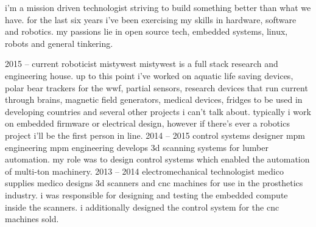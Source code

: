 \documentclass[9pt]{developercv} %
\begin{document}
\begin{minipage}[t]{0.4\textwidth} %
	\vspace{-\baselineskip} %
  i'm a mission driven technologist striving to build something better than what we have. for the last six years i've been exercising my skills in hardware, software and robotics. my passions lie in open source tech, embedded systems, linux, robots and general tinkering. 
\end{minipage}
\hfill %
\begin{minipage}[t]{0.5\textwidth} %
	\vspace{-\baselineskip} %
	\begin{barchart}{5.5}
	\end{barchart}
\end{minipage}


\begin{entrylist}
	\entry
		{2015 -- current}
		{roboticist}
		{mistywest}
		{mistywest is a full stack research and engineering house. up to this point i've worked on aquatic life saving devices, polar bear trackers for the wwf, partial sensors, research devices that run current through brains, magnetic field generators, medical devices, fridges to be used in developing countries and several other projects i can't talk about. typically i work on embedded firmware or electrical design, however if there's ever a robotics project i'll be the first person in line.}
	\entry
		{2014 -- 2015}
		{control systems designer}
		{mpm engineering}
		{mpm engineering develops 3d scanning systems for lumber automation. my role was to design control systems which enabled the automation of multi-ton machinery.}
	\entry
		{2013 -- 2014}
		{electromechanical technologist}
		{medico supplies}
		{medico designs 3d scanners and cnc machines for use in the prosthetics industry. i was responsible for designing and testing the embedded compute inside the scanners. i additionally designed the control system for the cnc machines sold.}
\end{entrylist}
\end{document}
